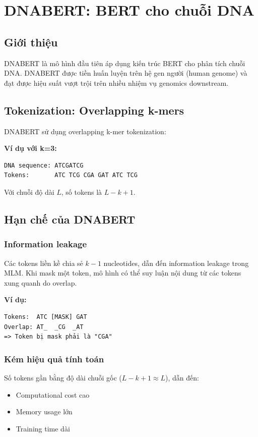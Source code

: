 \section{DNABERT: BERT cho chuỗi DNA}
\label{sec:dnabert}

\subsection{Giới thiệu}

DNABERT \cite{ji2021dnabert} là mô hình đầu tiên áp dụng kiến trúc BERT cho phân tích chuỗi DNA. DNABERT được tiền huấn luyện trên hệ gen người (human genome) và đạt được hiệu suất vượt trội trên nhiều nhiệm vụ genomics downstream.

\subsection{Tokenization: Overlapping k-mers}

DNABERT sử dụng overlapping k-mer tokenization:

\textbf{Ví dụ với k=3:}
\begin{verbatim}
DNA sequence: ATCGATCG
Tokens:       ATC TCG CGA GAT ATC TCG
\end{verbatim}

Với chuỗi độ dài $L$, số tokens là $L - k + 1$.

\subsection{Hạn chế của DNABERT}

\subsubsection{Information leakage}

Các tokens liền kề chia sẻ $k-1$ nucleotides, dẫn đến information leakage trong MLM. Khi mask một token, mô hình có thể suy luận nội dung từ các tokens xung quanh do overlap.

\textbf{Ví dụ:}
\begin{verbatim}
Tokens:  ATC [MASK] GAT
Overlap: AT_  _CG  _AT
=> Token bị mask phải là "CGA"
\end{verbatim}

\subsubsection{Kém hiệu quả tính toán}

Số tokens gần bằng độ dài chuỗi gốc ($L - k + 1 \approx L$), dẫn đến:
\begin{itemize}
    \item Computational cost cao
    \item Memory usage lớn
    \item Training time dài
\end{itemize}

